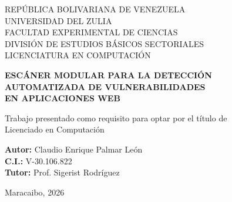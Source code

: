 \documentclass[12pt, a4paper]{article}
\begin{document}
\begin{titlepage}
    \centering
    \singlespacing

    \vspace*{1cm}

    {\footnotesize
        REPÚBLICA BOLIVARIANA DE VENEZUELA\\
        UNIVERSIDAD DEL ZULIA\\
        FACULTAD EXPERIMENTAL DE CIENCIAS\\
        DIVISIÓN DE ESTUDIOS BÁSICOS SECTORIALES\\
        LICENCIATURA EN COMPUTACIÓN
    }

    \vspace{4cm}

    {\LARGE \textbf{ESCÁNER MODULAR PARA LA DETECCIÓN\\
    AUTOMATIZADA DE VULNERABILIDADES\\
    EN APLICACIONES WEB}}

    \vspace{1cm}

    {\large Trabajo presentado como requisito para optar por el título de\\
    Licenciado en Computación}

    \vspace{4cm}

    \begin{flushright}
        \textbf{Autor:} Claudio Enrique Palmar León\\
        \textbf{C.I.:} V-30.106.822\\[0.5cm]
        \textbf{Tutor:} Prof. Sigerist Rodríguez
    \end{flushright}

    \vfill

    {\large Maracaibo, 2026}
\end{titlepage}


\newpage
\thispagestyle{empty}
\end{document}
